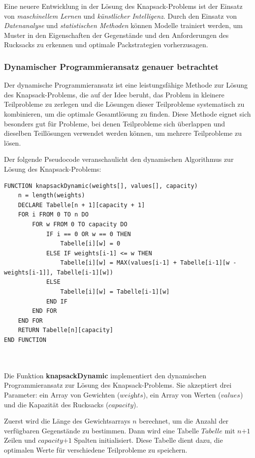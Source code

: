 Eine neuere Entwicklung in der Lösung des Knapsack-Problems ist der Einsatz von \textit{maschinellem Lernen} und \textit{künstlicher Intelligenz}.
Durch den Einsatz von \textit{Datenanalyse} und \textit{statistischen Methoden} können Modelle trainiert werden, um Muster
in den Eigenschaften der Gegenstände und den Anforderungen des Rucksacks zu erkennen und optimale Packstrategien vorherzusagen.

\subsubsection*{Dynamischer Programmieransatz genauer betrachtet}
Der dynamische Programmieransatz ist eine leistungsfähige Methode zur Lösung des Knapsack-Problems, die auf der Idee beruht,
das Problem in kleinere Teilprobleme zu zerlegen und die Lösungen dieser Teilprobleme systematisch zu kombinieren, um die
optimale Gesamtlösung zu finden. Diese Methode eignet sich besonders gut für Probleme, bei denen Teilprobleme sich überlappen
und dieselben Teillösungen verwendet werden können, um mehrere Teilprobleme zu lösen.

Der folgende Pseudocode veranschaulicht den dynamischen Algorithmus zur Lösung des Knapsack-Problems:
\begin{lstlisting}[style=csharp, caption={Dynamischer Algorithmus}]
FUNCTION knapsackDynamic(weights[], values[], capacity)
    n = length(weights)
    DECLARE Tabelle[n + 1][capacity + 1]
    FOR i FROM 0 TO n DO
        FOR w FROM 0 TO capacity DO
            IF i == 0 OR w == 0 THEN
                Tabelle[i][w] = 0
            ELSE IF weights[i-1] <= w THEN
                Tabelle[i][w] = MAX(values[i-1] + Tabelle[i-1][w - weights[i-1]], Tabelle[i-1][w])
            ELSE
                Tabelle[i][w] = Tabelle[i-1][w]
            END IF
        END FOR
    END FOR
    RETURN Tabelle[n][capacity]
END FUNCTION
\end{lstlisting}\\
\\
Die Funktion \textbf{knapsackDynamic} implementiert den dynamischen Programmieransatz zur Lösung des Knapsack-Problems.
Sie akzeptiert drei Parameter: ein Array von Gewichten (\( \textit{weights} \)), ein Array von Werten (\( \textit{values} \))
und die Kapazität des Rucksacks (\( \textit{capacity} \)).

Zuerst wird die Länge des Gewichtsarrays \( \textit{n} \) berechnet, um die Anzahl der verfügbaren Gegenstände zu bestimmen.
Dann wird eine Tabelle \( \textit{Tabelle} \) mit \( \textit{n+1} \) Zeilen und \( \textit{capacity+1} \) Spalten initialisiert.
Diese Tabelle dient dazu, die optimalen Werte für verschiedene Teilprobleme zu speichern.

